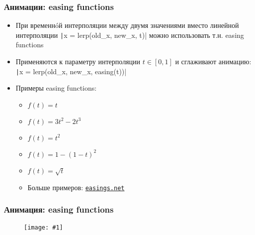 \documentclass[10pt]{beamer}
\newcommand{\slideimage}[1]{
  \begin{figure}
    \begin{adjustbox}{width=\textwidth, totalheight=\textheight-2\baselineskip-2\baselineskip,keepaspectratio}
      \texttt{[image: \#1]}
    \end{adjustbox}
  \end{figure}
}
\begin{document}
\begin{frame}[fragile]
\frametitle{Анимации: easing functions}
\begin{itemize}
\item При временнóй интерполяции между двумя значениями вместо линейной интерполяции \texttt|x = lerp(old_x, new_x, t)| можно использовать т.н. easing functions
\pause
\item Применяются к параметру интерполяции \begin{math}t \in [0, 1]\end{math} и сглаживают анимацию: \texttt|x = lerp(old_x, new_x, easing(t))|
\pause
\item Примеры easing functions:
\begin{itemize}
\item \begin{math}f(t) = t\end{math}
\item \begin{math}f(t) = 3t^2-2t^3\end{math}
\item \begin{math}f(t) = t^2\end{math}
\item \begin{math}f(t) = 1 - (1-t)^2\end{math}
\item \begin{math}f(t) = \sqrt{t}\end{math}
\item Больше примеров: \href{https://easings.net}{\texttt{easings.net}}
\end{itemize}
\end{itemize}
\end{frame}

\begin{frame}[fragile]
\frametitle{Анимация: easing functions}
\slideimage{easing.png}
\end{frame}
\end{document}
